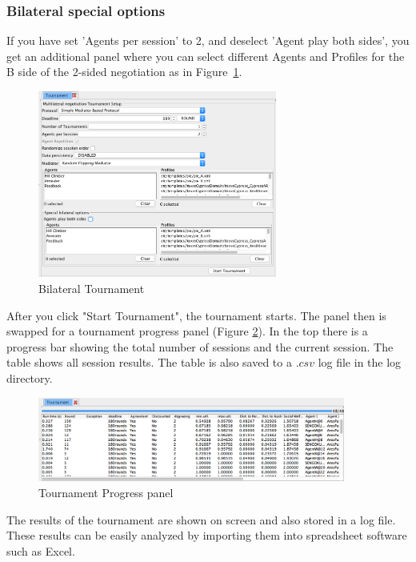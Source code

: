 \documentclass[]{article}
\begin{document}
\subsubsection{Bilateral special options}
If you have set 'Agents per session' to 2, and deselect 'Agent play both sides', you get an additional panel where you can select different Agents and Profiles for the B side of the 2-sided negotiation as in Figure~\ref{Fig:multipartytournament2}. 

\begin{figure}[htb]
	\centering
	\includegraphics[width=0.7\textwidth]{media/multipartytournament2.png}
\caption{Bilateral Tournament}\label{Fig:multipartytournament2}
\end{figure}

After you click "Start Tournament", the tournament starts. The panel then is swapped for a tournament progress panel (Figure \ref{Fig:tournamentprogress}). 
In the top there is a progress bar showing the total number of sessions and the current session. The table shows all session results. The table is also saved to a $.csv$ log file in the log directory.

\begin{figure}[htb]
	\centering
	\includegraphics[width=0.9\textwidth]{media/tournamentprogress.png}
\caption{Tournament Progress panel}\label{Fig:tournamentprogress}
\end{figure}

The results of the tournament are shown on screen and also stored in a log file.  These results can be easily analyzed by importing them into spreadsheet software such as Excel.
\end{document}
